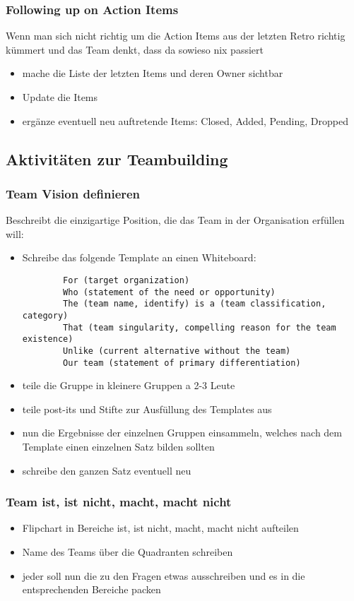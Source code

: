 \subsubsection{Following up on Action Items}
Wenn man sich nicht richtig um die Action Items aus der letzten Retro richtig kümmert und das Team
denkt, dass da sowieso nix passiert
\begin{itemize}
  \item mache die Liste der letzten Items und deren Owner sichtbar
  \item Update die Items
  \item ergänze eventuell neu auftretende Items: Closed, Added, Pending, Dropped
\end{itemize}



\subsection{Aktivitäten zur Teambuilding}
\subsubsection{Team Vision definieren}
Beschreibt die einzigartige Position, die das Team in der Organisation erfüllen will:

\begin{itemize}
  \item Schreibe das folgende Template an einen Whiteboard:
    \begin{verbatim}
        For (target organization)
        Who (statement of the need or opportunity)
        The (team name, identify) is a (team classification, category)
        That (team singularity, compelling reason for the team existence)
        Unlike (current alternative without the team)
        Our team (statement of primary differentiation)
    \end{verbatim}
  \item teile die Gruppe in kleinere Gruppen a 2-3 Leute
  \item teile post-its und Stifte zur Ausfüllung des Templates aus
  \item nun die Ergebnisse der einzelnen Gruppen einsammeln, welches nach dem
    Template einen einzelnen Satz bilden sollten
  \item schreibe den ganzen Satz eventuell neu
\end{itemize}


\subsubsection{Team ist, ist nicht, macht, macht nicht}
\begin{itemize}
  \item Flipchart in Bereiche ist, ist nicht, macht, macht nicht aufteilen
  \item Name des Teams über die Quadranten schreiben
  \item jeder soll nun die zu den Fragen etwas ausschreiben und es in die entsprechenden
    Bereiche packen
\end{itemize}



